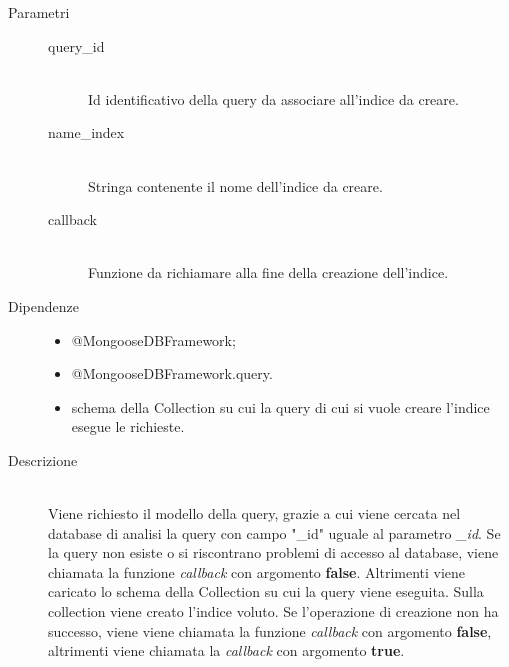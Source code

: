 \begin{description}
\begin{mldescription}
    \begin{description}
	 \item[Parametri] \hfill
	  \begin{description}
	   \item[query\_id] \hfill \\
	   Id identificativo della query da associare all'indice da creare.
	   \item[name\_index] \hfill \\
	   Stringa contenente il nome dell'indice da creare.
	   \item[callback] \hfill \\
	   Funzione da richiamare alla fine della creazione dell'indice.
	  \end{description}
	 \item[Dipendenze] \hfill
	  \begin{itemize}
	   \item @MongooseDBFramework;	   
	   \item @MongooseDBFramework.query.
	   \item schema della Collection su cui la query di cui si vuole creare l'indice esegue le richieste.
	  \end{itemize}
	 \item[Descrizione] \hfill \\
	 Viene richiesto il modello della query, grazie a cui viene cercata nel database di analisi la query con campo "\_id" uguale al parametro \textit{\_id}. Se la query non esiste o si riscontrano problemi di accesso al database, viene chiamata la funzione \textit{callback} con argomento \textbf{false}. Altrimenti viene caricato lo schema della Collection su cui la query viene eseguita. Sulla collection viene creato l'indice voluto. Se l'operazione di creazione non ha successo, viene viene chiamata la funzione \textit{callback} con argomento \textbf{false}, altrimenti viene chiamata la \textit{callback} con argomento \textbf{true}.
	 
	\end{description}	    
    
  \end{mldescription}
\end{description}

